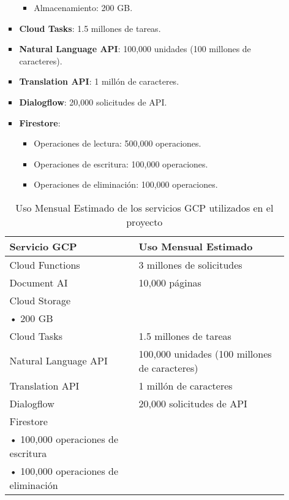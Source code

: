 \begin{enumerate}
\begin{enumerate}
\begin{itemize}
\begin{itemize}
							\item Almacenamiento: 200 GB.
						\end{itemize}

					\item \textbf{Cloud Tasks}: 1.5 millones de tareas.

					\item \textbf{Natural Language API}: 100,000 unidades (100 millones de
						caracteres).

					\item \textbf{Translation API}: 1 millón de caracteres.

					\item \textbf{Dialogflow}: 20,000 solicitudes de API.

					\item \textbf{Firestore}:
						\begin{itemize}
							\item Operaciones de lectura: 500,000 operaciones.

							\item Operaciones de escritura: 100,000 operaciones.

							\item Operaciones de eliminación: 100,000 operaciones.
						\end{itemize}
				\end{itemize}

				\begin{table}[h]
					\centering
					\begin{tabularx}
						{\textwidth}{@{}lX@{}} \toprule \textbf{Servicio GCP} & \textbf{Uso
						Mensual Estimado} \\ \midrule Cloud Functions & 3 millones de
						solicitudes \\ Document AI & 10,000 páginas \\ Cloud Storage &
						\begin{tabular}[t]{@{}l@{}}
							• 200,000 operaciones \\
							• 200 GB
						\end{tabular}
						\\ Cloud Tasks & 1.5 millones de tareas \\ Natural Language API &
						100,000 unidades (100 millones de caracteres) \\ Translation API & 1
						millón de caracteres \\ Dialogflow & 20,000 solicitudes de API \\
						Firestore &
						\begin{tabular}[t]{@{}l@{}}
							• 500,000 operaciones de lectura     \\
							• 100,000 operaciones de escritura   \\
							• 100,000 operaciones de eliminación
						\end{tabular}
						\\ \bottomrule
					\end{tabularx}
					\caption{Uso Mensual Estimado de los servicios GCP utilizados en el
					proyecto}
					\label{tab:uso_gcp}
				\end{table}


\end{enumerate}
\end{enumerate}
